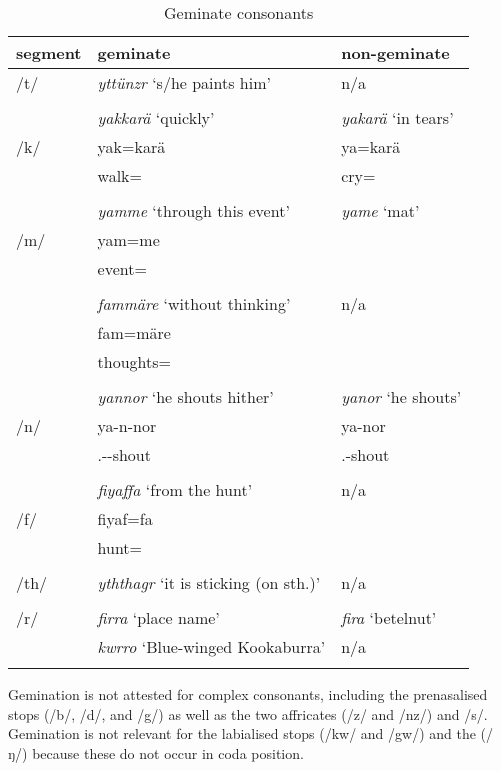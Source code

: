 \begin{table}
\caption{Geminate consonants}
\label{geminates}
	\begin{tabularx}{\textwidth}{Xll}
		\lsptoprule
		{segment} & {geminate} & {non-geminate} \\ \midrule
		/t/ & \emph{yttünzr} `s/he paints him' & n/a \\
		&&\\
		& \emph{yakkarä} `quickly' & \emph{yakarä} `in tears'\\
		/k/ & yak=karä & ya=karä \\
		& walk=\Prop{} & cry=\Prop{}\\
		&&\\
		& \emph{yamme} `through this event' & \emph{yame} `mat' \\
		/m/ & yam=me & \\
		& event=\Ins{} & \\
		&&\\
		& \emph{fammäre} `without thinking' & n/a \\
 	   	& fam=märe & \\
 	   	& thoughts=\Priv{} & \\
		&&\\
		& \emph{yannor} `he shouts hither' & \emph{yanor} `he shouts'\\
		/n/ & ya-n-nor & ya-nor \\
		& \Tsg{}.\Masc{}-\Venit{}-shout & \Tsg{}.\Masc{}-shout\\
		&&\\
 	   	& \emph{fiyaffa} `from the hunt' & n/a \\
		/f/ & fiyaf=fa & \\
		& hunt=\Abl{} & \\
		&&\\
		/th/ & \emph{yththagr} `it is sticking (on sth.)' 	& n/a \\
		&&\\
		/r/ & \emph{firra} `place name' & \emph{fira} `betelnut'\\
		& \emph{kwrro} `Blue-winged Kookaburra' & n/a \\
		\lspbottomrule
	\end{tabularx}
\end{table}%

Gemination is not attested for complex consonants, including the prenasalised stops (/b/, /d/, and /g/) as well as the two affricates (/z/ and /nz/) and /s/. Gemination is not relevant for the labialised  stops (/kw/ and /gw/) and the   (/ŋ/) because these do not occur in coda position.

